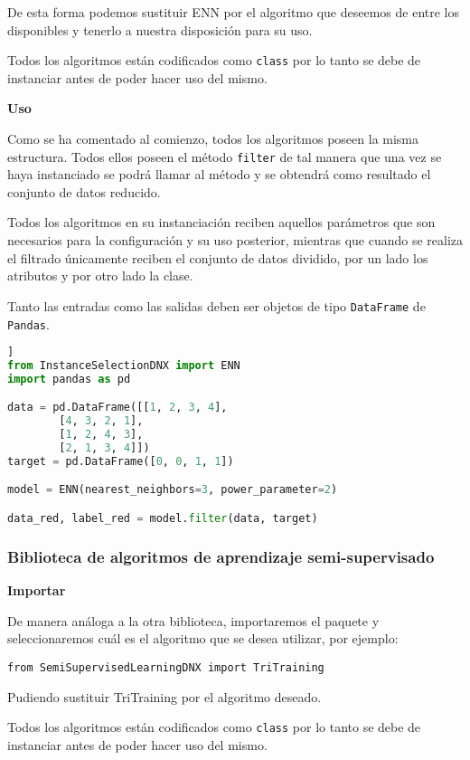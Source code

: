 De esta forma podemos sustituir ENN por el algoritmo que deseemos de entre los disponibles y tenerlo a nuestra disposición para su uso.

Todos los algoritmos están codificados como \texttt{class} por lo tanto se debe de instanciar antes de poder hacer uso del mismo. 

\textbf{Uso}

Como se ha comentado al comienzo, todos los algoritmos poseen la misma estructura. Todos ellos poseen el método \texttt{filter} de tal manera que una vez se haya instanciado se podrá llamar al método y se obtendrá como resultado el conjunto de datos reducido.

Todos los algoritmos en su instanciación reciben aquellos parámetros que son necesarios para la configuración y su uso posterior, mientras que cuando se realiza el filtrado únicamente reciben el conjunto de datos dividido, por un lado los atributos y por otro lado la clase.

Tanto las entradas como las salidas deben ser objetos de tipo \texttt{DataFrame} de \texttt{Pandas}.

\begin{lstlisting}[language=python, caption={Ejemplo de uso de ENN}]]
from InstanceSelectionDNX import ENN
import pandas as pd

data = pd.DataFrame([[1, 2, 3, 4],
        [4, 3, 2, 1],
        [1, 2, 4, 3],
        [2, 1, 3, 4]])
target = pd.DataFrame([0, 0, 1, 1])

model = ENN(nearest_neighbors=3, power_parameter=2)

data_red, label_red = model.filter(data, target)
\end{lstlisting}

\subsubsection{Biblioteca de algoritmos de aprendizaje semi-supervisado}
\textbf{Importar}

De manera análoga a la otra biblioteca, importaremos el paquete y seleccionaremos cuál es el algoritmo que se desea utilizar, por ejemplo:

\texttt{from SemiSupervisedLearningDNX import TriTraining}

Pudiendo sustituir TriTraining por el algoritmo deseado.

Todos los algoritmos están codificados como \texttt{class} por lo tanto se debe de instanciar antes de poder hacer uso del mismo. 

